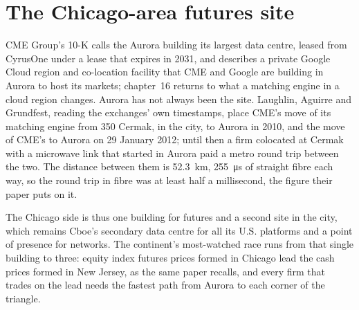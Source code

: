 \section{The Chicago-area futures site}

CME Group's 10-K calls the Aurora building its largest data centre, leased from CyrusOne under a lease that expires in 2031, and describes a
private Google Cloud region and co-location facility that CME and Google are building in Aurora to host its markets; chapter~16 returns to
what a matching engine in a cloud region changes. Aurora has not always been the site. Laughlin, Aguirre and Grundfest, reading the
exchanges' own timestamps, place CME's move of its matching engine from 350 Cermak, in the city, to Aurora in 2010, and the move of CME's
 to Aurora on 29 January 2012; until then a firm colocated at Cermak with a microwave link that started in Aurora paid a metro round
trip between the two. The distance between them is \qty{52.3}{\kilo\metre}, \qty{255}{\micro\second} of straight fibre each way, so the round
trip in fibre was at least half a millisecond, the figure their paper puts on it.

The Chicago side is thus one building for futures and a second site in the city, which remains Cboe's secondary data centre for all its U.S.
platforms and a point of presence for networks. The continent's most-watched race runs from that single building to three: equity index
futures prices formed in Chicago lead the cash prices formed in New Jersey, as the same paper recalls, and every firm that trades on the lead
needs the fastest path from Aurora to each corner of the triangle.


